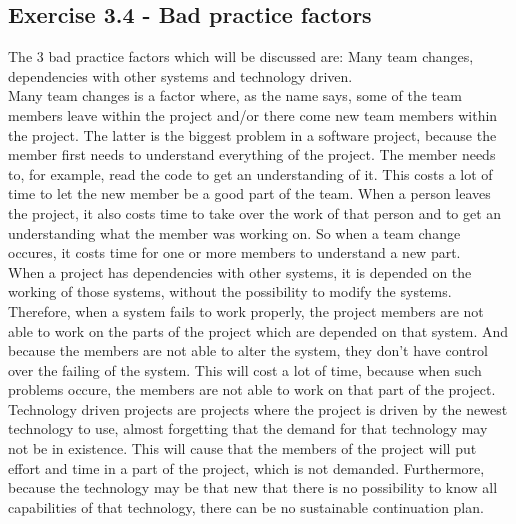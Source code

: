 \documentclass[10pt]{article}
\begin{document}
\subsection{Exercise 3.4 - Bad practice factors}
The 3 bad practice factors which will be discussed are: Many team changes, dependencies with other systems and technology driven.\\
Many team changes is a factor where, as the name says, some of the team members leave within the project and/or there come new team members within the project. The latter is the biggest problem in a software project, because the member first needs to understand everything of the project. The member needs to, for example, read the code to get an understanding of it. This costs a lot of time to let the new member be a good part of the team. When a person leaves the project, it also costs time to take over the work of that person and to get an understanding what the member was working on. So when a team change occures, it costs time for one or more members to understand a new part.\\
When a project has dependencies with other systems, it is depended on the working of those systems, without the possibility to modify the systems. Therefore, when a system fails to work properly, the project members are not able to work on the parts of the project which are depended on that system. And because the members are not able to alter the system, they don't have control over the failing of the system. This will cost a lot of time, because when such problems occure, the members are not able to work on that part of the project.\\
Technology driven projects are projects where the project is driven by the newest technology to use, almost forgetting that the demand for that technology may not be in existence. This will cause that the members of the project will put effort and time in a part of the project, which is not demanded. Furthermore, because the technology may be that new that there is no possibility to know all capabilities of that technology, there can be no sustainable continuation plan. 
\end{document}
